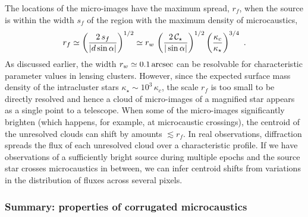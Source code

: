 \documentclass{aastex6}
\begin{document}
The locations of the micro-images have the maximum spread, $r_f$, when the source is within the width $s_f$ of the region with the maximum density of microcaustics,
\begin{equation}
\label{eq:rf}
 r_f \simeq \left( {2\,s_f\over | d\sin\alpha | } \right)^{1/2} \simeq
 r_w\, \left( {2\, \mathcal{C}_{\star} \over |\sin\alpha | } \right)^{1/2}
       \left( {\kappa_c\over \kappa_\star} \right)^{3/4} ~.
\end{equation}
As discussed earlier, the width $r_w \simeq 0.1 \,{\rm arcsec}$ can be resolvable for characteristic parameter values in lensing clusters. However, since the expected surface mass density of the intracluster stars $\kappa_\star \sim 10^3\, \kappa_c$, the scale $r_f$ is too small to be directly resolved and hence a cloud of micro-images of a magnified star appears as a single point to a telescope. When some of the micro-images significantly brighten (which happens, for example, at microcaustic crossings), the centroid of the unresolved clouds can shift by amounts $\lesssim r_f$. In real observations, diffraction spreads the flux of each unresolved cloud over a characteristic profile. If we have observations of a sufficiently bright source during multiple epochs and the source star crosses microcaustics in between, we can infer centroid shifts from variations in the distribution of fluxes across several pixels.

\subsubsection{Summary: properties of corrugated microcaustics}
\label{sec:sumc}
\end{document}
